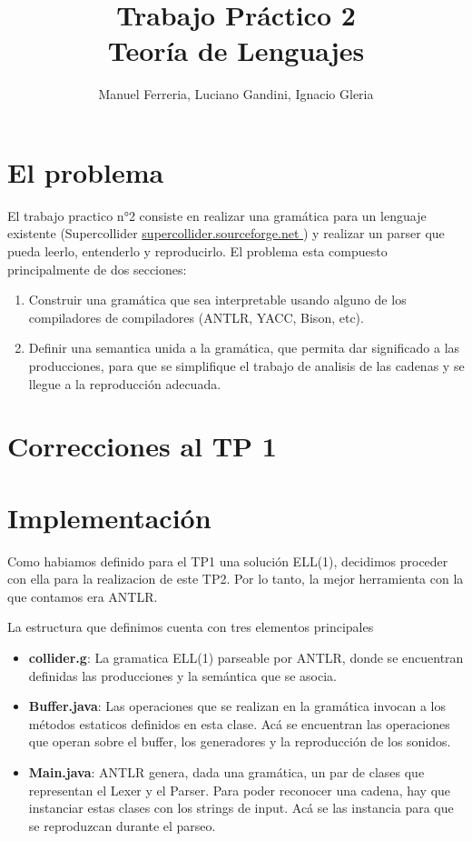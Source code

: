 \documentclass[a4paper]{article}
\title{Trabajo Pr\'actico 2 \\ Teoría de Lenguajes}
\author{Manuel Ferreria, Luciano Gandini, Ignacio Gleria}
\begin{document}
\maketitle


\section{El problema}
El trabajo practico n°2 consiste en realizar una gram\'atica para un lenguaje
existente (Supercollider \url{supercollider.sourceforge.net }) y realizar un parser que pueda leerlo, entenderlo
y reproducirlo. El problema esta compuesto principalmente de dos secciones:
\begin{enumerate}
    \item Construir una gram\'atica que sea interpretable usando alguno de los
        compiladores de compiladores (ANTLR, YACC, Bison, etc).
    \item Definir una semantica unida a la gram\'atica, que permita dar significado
        a las producciones, para que se simplifique el trabajo de analisis de las
        cadenas y se llegue a la reproducci\'on adecuada.
\end{enumerate}

\section{Correcciones al TP 1}

\section{Implementaci\'on}

Como habiamos definido para el TP1 una soluci\'on ELL(1), decidimos proceder con
ella para la realizacion de este TP2. Por lo tanto, la mejor herramienta con la
que contamos era ANTLR. 

La estructura que definimos cuenta con tres elementos principales
\begin{itemize}
    \item \textbf{collider.g}: La gramatica ELL(1) parseable por ANTLR,
        donde se encuentran definidas las producciones y la sem\'antica
        que se asocia.
    \item \textbf{Buffer.java}: Las operaciones que se realizan en la 
        gram\'atica invocan a los m\'etodos estaticos definidos en esta
        clase. Ac\'a se encuentran las operaciones que operan sobre el 
        buffer, los generadores y la reproducci\'on de los sonidos.
    \item \textbf{Main.java}: ANTLR genera, dada una gram\'atica, un
        par de clases que representan el Lexer y el Parser. Para
        poder reconocer una cadena, hay que instanciar estas clases
        con los strings de input. Ac\'a se las instancia para que se 
        reproduzcan durante el parseo.
\end{itemize}
\end{document}
